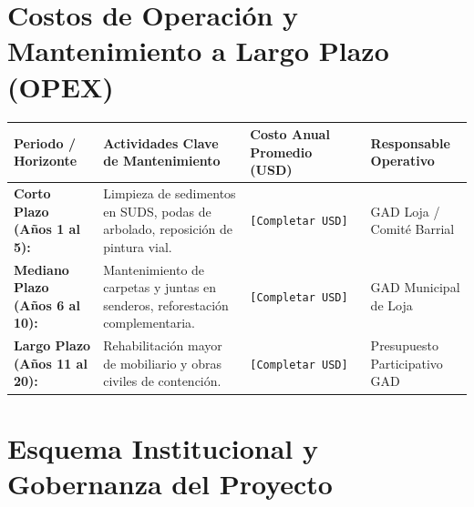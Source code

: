 \documentclass[
  letterpaper,
  DIV=11,
  numbers=noendperiod]{scrreprt}
\newcounter{none} %
\begin{document}
\section{Costos de Operación y Mantenimiento a Largo Plazo
(OPEX)}\label{costos-de-operaciuxf3n-y-mantenimiento-a-largo-plazo-opex}

{\def\LTcaptype{none} %
\begin{longtable}[]{@{}
  >{\raggedright\arraybackslash}p{}
  >{\raggedright\arraybackslash}p{}
  >{\raggedright\arraybackslash}p{}
  >{\raggedright\arraybackslash}p{}@{}}
\toprule\noalign{}
\begin{minipage}[b]{\linewidth}\raggedright
Periodo / Horizonte
\end{minipage} & \begin{minipage}[b]{\linewidth}\raggedright
Actividades Clave de Mantenimiento
\end{minipage} & \begin{minipage}[b]{\linewidth}\raggedright
Costo Anual Promedio (USD)
\end{minipage} & \begin{minipage}[b]{\linewidth}\raggedright
Responsable Operativo
\end{minipage} \\
\midrule\noalign{}
\endhead
\bottomrule\noalign{}
\endlastfoot
\textbf{Corto Plazo (Años 1 al 5):} & Limpieza de sedimentos en SUDS,
podas de arbolado, reposición de pintura vial. &
\texttt{{[}Completar\ USD{]}} & GAD Loja / Comité Barrial \\
\textbf{Mediano Plazo (Años 6 al 10):} & Mantenimiento de carpetas y
juntas en senderos, reforestación complementaria. &
\texttt{{[}Completar\ USD{]}} & GAD Municipal de Loja \\
\textbf{Largo Plazo (Años 11 al 20):} & Rehabilitación mayor de
mobiliario y obras civiles de contención. &
\texttt{{[}Completar\ USD{]}} & Presupuesto Participativo GAD \\
\end{longtable}
}

\section{Esquema Institucional y Gobernanza del
Proyecto}\label{esquema-institucional-y-gobernanza-del-proyecto}
\end{document}
